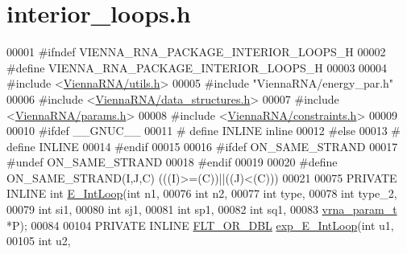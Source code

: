 \hypertarget{interior__loops_8h_source}{}\section{interior\+\_\+loops.\+h}
\label{interior__loops_8h_source}

\begin{DoxyCode}
00001 \textcolor{preprocessor}{#ifndef VIENNA\_RNA\_PACKAGE\_INTERIOR\_LOOPS\_H}
00002 \textcolor{preprocessor}{#define VIENNA\_RNA\_PACKAGE\_INTERIOR\_LOOPS\_H}
00003 
00004 \textcolor{preprocessor}{#include <\hyperlink{utils_8h}{ViennaRNA/utils.h}>}
00005 \textcolor{preprocessor}{#include "ViennaRNA/energy\_par.h"}
00006 \textcolor{preprocessor}{#include <\hyperlink{data__structures_8h}{ViennaRNA/data\_structures.h}>}
00007 \textcolor{preprocessor}{#include <\hyperlink{params_8h}{ViennaRNA/params.h}>}
00008 \textcolor{preprocessor}{#include <\hyperlink{constraints_8h}{ViennaRNA/constraints.h}>}
00009 
00010 \textcolor{preprocessor}{#ifdef \_\_GNUC\_\_}
00011 \textcolor{preprocessor}{# define INLINE inline}
00012 \textcolor{preprocessor}{#else}
00013 \textcolor{preprocessor}{# define INLINE}
00014 \textcolor{preprocessor}{#endif}
00015 
00016 \textcolor{preprocessor}{#ifdef ON\_SAME\_STRAND}
00017 \textcolor{preprocessor}{#undef ON\_SAME\_STRAND}
00018 \textcolor{preprocessor}{#endif}
00019 
00020 \textcolor{preprocessor}{#define ON\_SAME\_STRAND(I,J,C)  (((I)>=(C))||((J)<(C)))}
00021 
00075 PRIVATE INLINE \textcolor{keywordtype}{int} \hyperlink{group__loops_ga0266d2c7a6098259280fb97e9f980b34}{E\_IntLoop}(\textcolor{keywordtype}{int} n1,
00076                               \textcolor{keywordtype}{int} n2,
00077                               \textcolor{keywordtype}{int} type,
00078                               \textcolor{keywordtype}{int} type\_2,
00079                               \textcolor{keywordtype}{int} si1,
00080                               \textcolor{keywordtype}{int} sj1,
00081                               \textcolor{keywordtype}{int} sp1,
00082                               \textcolor{keywordtype}{int} sq1,
00083                               \hyperlink{group__energy__parameters_structvrna__param__s}{vrna\_param\_t} *P);
00084 
00104 PRIVATE INLINE \hyperlink{group__data__structures_ga31125aeace516926bf7f251f759b6126}{FLT\_OR\_DBL} \hyperlink{group__loops_ga19f10a6a02bbd07f4cd27b16ac928ea3}{exp\_E\_IntLoop}(\textcolor{keywordtype}{int} u1,
00105                                         \textcolor{keywordtype}{int} u2,

\end{DoxyCode}
